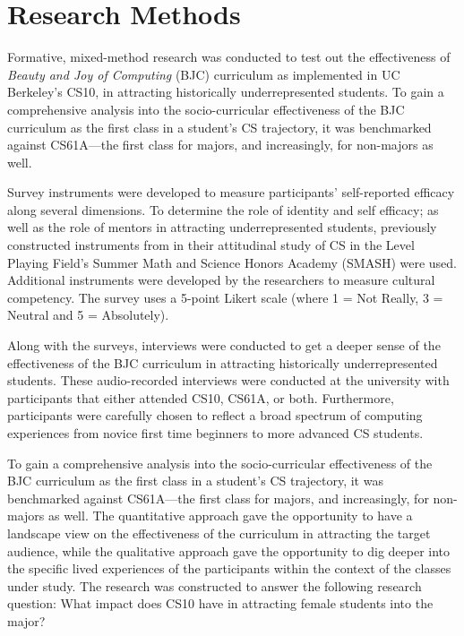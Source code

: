 \documentclass[oneside,titlepage,numbers=noenddot,headinclude,%
               footinclude=true,cleardoublepage=empty,abstractoff,BCOR=2mm,%
               paper=a4,fontsize=11pt,ngerman,american]{scrreprt}
\numberwithin{theorem}{chapter}
\numberwithin{definition}{chapter}
\numberwithin{algorithm}{chapter}
\numberwithin{figure}{chapter}
\numberwithin{table}{chapter}
\numberwithin{equation}{chapter}
\begin{document}
\section *{Research Methods}

Formative, mixed-method research was conducted to test out the effectiveness of \emph{Beauty and Joy of Computing} (BJC) curriculum as implemented in UC Berkeley's CS10, in attracting historically underrepresented students. To gain a comprehensive analysis into the socio-curricular effectiveness of the BJC curriculum as the first class in a student's CS trajectory, it was benchmarked against CS61A---the first class for majors, and increasingly, for non-majors as well. 

Survey instruments were developed to measure participants' self-reported efficacy along several dimensions. To determine the role of identity and self efficacy; as well as the role of mentors in attracting underrepresented students, previously constructed instruments from \cite{Martin:2013fk} in their attitudinal study of CS in the Level Playing Field's Summer Math and Science Honors Academy (SMASH) were used. Additional instruments were developed by the researchers to measure cultural competency. The survey uses a 5-point Likert scale (where 1 = Not Really, 3 = Neutral and 5 = Absolutely).

Along with the surveys, interviews were conducted to get a deeper sense of the effectiveness of the BJC curriculum in attracting historically underrepresented students. These audio-recorded interviews were conducted at the university with participants that either attended CS10, CS61A, or both. Furthermore, participants were carefully chosen to reflect a broad spectrum of computing experiences from novice first time beginners to more advanced CS students. 

To gain a comprehensive analysis into the socio-curricular effectiveness of the BJC curriculum as the first class in a student's CS trajectory, it was benchmarked against CS61A---the first class for majors, and increasingly, for non-majors as well. The quantitative approach gave the opportunity to have a landscape view on the effectiveness of the curriculum in attracting the target audience, while the qualitative approach gave the opportunity to dig deeper into the specific lived experiences of the participants within the context of the classes under study. The research was constructed to answer the following research question: What impact does CS10 have in attracting female students into the major?
\end{document}
